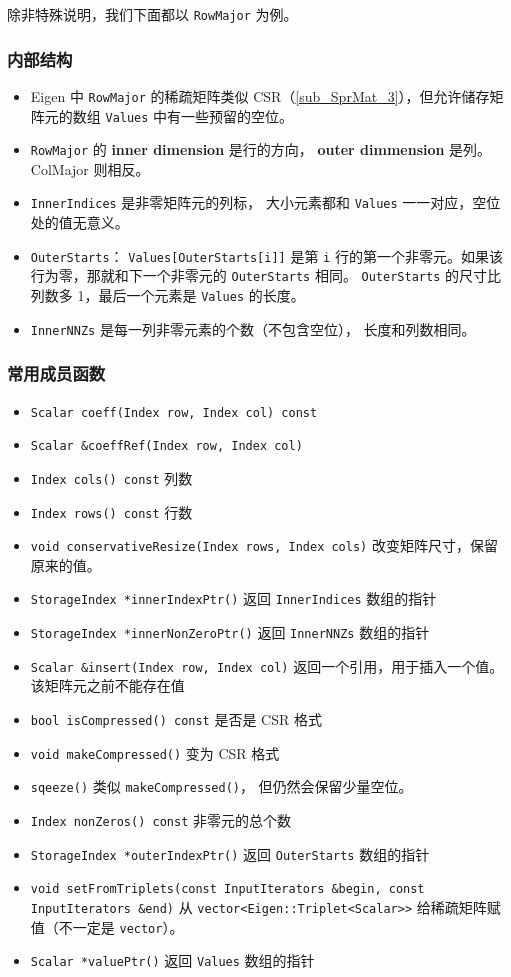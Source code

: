 除非特殊说明，我们下面都以 \verb`RowMajor` 为例。

\subsubsection{内部结构}
\begin{itemize}
\item Eigen 中 \verb`RowMajor` 的稀疏矩阵类似 CSR（\autoref{sub_SprMat_3}），但允许储存矩阵元的数组 \verb`Values` 中有一些预留的空位。
\item \verb`RowMajor` 的 \textbf{inner dimension} 是行的方向， \textbf{outer dimmension} 是列。 ColMajor 则相反。
\item \verb`InnerIndices` 是非零矩阵元的列标， 大小元素都和 \verb`Values` 一一对应，空位处的值无意义。
\item \verb`OuterStarts`： \verb`Values[OuterStarts[i]]` 是第 \verb`i` 行的第一个非零元。如果该行为零，那就和下一个非零元的 \verb`OuterStarts` 相同。 \verb`OuterStarts` 的尺寸比列数多 1，最后一个元素是 \verb`Values` 的长度。
\item \verb`InnerNNZs` 是每一列非零元素的个数（不包含空位）， 长度和列数相同。
\end{itemize}

\subsubsection{常用成员函数}
\begin{itemize}
\item \verb`Scalar coeff(Index row, Index col) const`
\item \verb`Scalar &coeffRef(Index row, Index col)`
\item \verb`Index cols() const` 列数
\item \verb`Index rows() const` 行数
\item \verb`void conservativeResize(Index rows, Index cols)` 改变矩阵尺寸，保留原来的值。
\item \verb`StorageIndex *innerIndexPtr()` 返回 \verb`InnerIndices` 数组的指针
\item \verb`StorageIndex *innerNonZeroPtr()` 返回 \verb`InnerNNZs` 数组的指针
\item \verb`Scalar &insert(Index row, Index col)` 返回一个引用，用于插入一个值。该矩阵元之前不能存在值
\item \verb`bool isCompressed() const` 是否是 CSR 格式
\item \verb`void makeCompressed()` 变为 CSR 格式
\item \verb`sqeeze()` 类似 \verb`makeCompressed()`， 但仍然会保留少量空位。
\item \verb`Index nonZeros() const` 非零元的总个数
\item \verb`StorageIndex *outerIndexPtr()` 返回 \verb`OuterStarts` 数组的指针

\item \verb`void setFromTriplets(const InputIterators &begin, const InputIterators &end)` 从 \verb`vector<Eigen::Triplet<Scalar>>` 给稀疏矩阵赋值（不一定是 \verb`vector`）。
\item \verb`Scalar *valuePtr()` 返回 \verb`Values` 数组的指针
\end{itemize}

